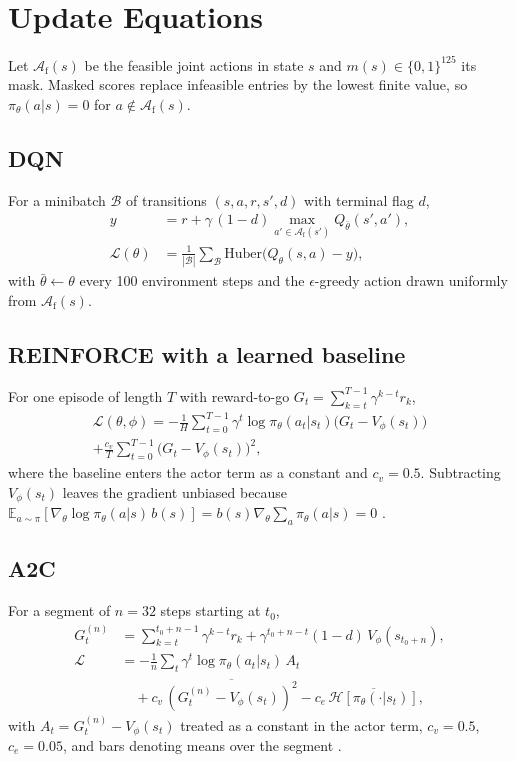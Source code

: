 \appendices
\section{Update Equations}

Let $\mathcal{A}_{\mathrm{f}}(s)$ be the feasible joint actions in state $s$ and
$m(s) \in \{0,1\}^{125}$ its mask. Masked scores replace infeasible entries by the lowest
finite value, so $\pi_\theta(a|s) = 0$ for $a \notin \mathcal{A}_{\mathrm{f}}(s)$.

\subsection{DQN}
For a minibatch $\mathcal{B}$ of transitions $(s, a, r, s', d)$ with terminal flag $d$,
\begin{align}
y &= r + \gamma\,(1 - d) \max_{a' \in \mathcal{A}_{\mathrm{f}}(s')} Q_{\bar\theta}(s', a'), \\
\mathcal{L}(\theta) &= \frac{1}{|\mathcal{B}|} \sum_{\mathcal{B}}
\mathrm{Huber}\bigl(Q_\theta(s, a) - y\bigr),
\end{align}
with $\bar\theta \leftarrow \theta$ every 100 environment steps and the $\epsilon$-greedy
action drawn uniformly from $\mathcal{A}_{\mathrm{f}}(s)$.

\subsection{REINFORCE with a learned baseline}
For one episode of length $T$ with reward-to-go
$G_t = \sum_{k=t}^{T-1} \gamma^{k-t} r_k$,
\begin{multline}
\mathcal{L}(\theta, \phi) = -\frac{1}{H}\sum_{t=0}^{T-1} \gamma^t \log \pi_\theta(a_t|s_t)
\bigl(G_t - V_\phi(s_t)\bigr) \\
+ \frac{c_v}{T} \sum_{t=0}^{T-1} \bigl(G_t - V_\phi(s_t)\bigr)^2,
\end{multline}
where the baseline enters the actor term as a constant and $c_v = 0.5$. Subtracting
$V_\phi(s_t)$ leaves the gradient unbiased because
$\mathbb{E}_{a \sim \pi}[\nabla_\theta \log \pi_\theta(a|s)\,b(s)] = b(s) \nabla_\theta
\sum_a \pi_\theta(a|s) = 0$ \cite{williams1992, sutton2018}.

\subsection{A2C}
For a segment of $n = 32$ steps starting at $t_0$,
\begin{align}
G^{(n)}_t &= \sum_{k=t}^{t_0+n-1} \gamma^{k-t} r_k + \gamma^{t_0+n-t} (1 - d)\,
V_\phi(s_{t_0+n}), \\
\mathcal{L} &= -\frac{1}{n}\sum_t \gamma^{t} \log \pi_\theta(a_t|s_t)\, A_t \nonumber \\
&\quad + c_v \,\overline{(G^{(n)}_t - V_\phi(s_t))^2}
- c_e \,\overline{\mathcal{H}[\pi_\theta(\cdot|s_t)]},
\end{align}
with $A_t = G^{(n)}_t - V_\phi(s_t)$ treated as a constant in the actor term, $c_v = 0.5$,
$c_e = 0.05$, and bars denoting means over the segment \cite{mnih2016}.

